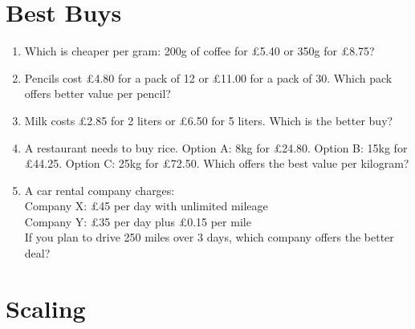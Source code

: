 \documentclass[12pt,a4paper]{article}
\begin{document}
\vspace{6cm}


\section*{Best Buys}

\begin{enumerate}
\item Which is cheaper per gram: 200g of coffee for £5.40 or 350g for £8.75?

\item Pencils cost £4.80 for a pack of 12 or £11.00 for a pack of 30. Which pack offers better value per pencil?

\item Milk costs £2.85 for 2 liters or £6.50 for 5 liters. Which is the better buy?

\item A restaurant needs to buy rice. Option A: 8kg for £24.80. Option B: 15kg for £44.25. Option C: 25kg for £72.50. Which offers the best value per kilogram?

\item A car rental company charges: \\
Company X: £45 per day with unlimited mileage \\
Company Y: £35 per day plus £0.15 per mile \\
If you plan to drive 250 miles over 3 days, which company offers the better deal?
\end{enumerate}

\newpage{}

\section*{Scaling}
\end{document}
